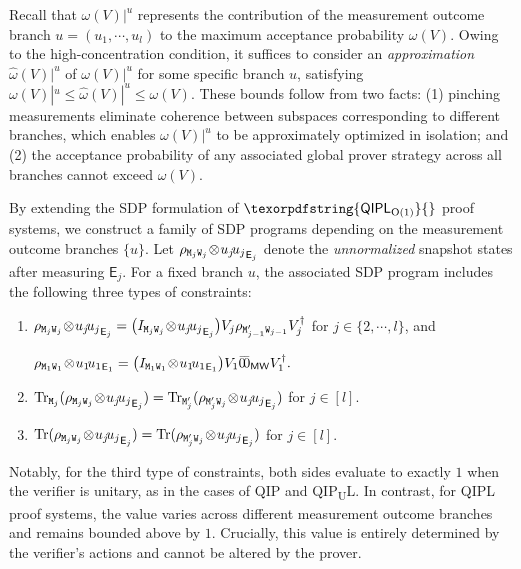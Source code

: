 \documentclass[10pt,a4paper]{article}
\numberwithin{equation}{section}
\numberwithin{figure}{section}
\newcommand{\QIP}{\textnormal{\textsf{QIP}}\xspace}
\newcommand{\QIPL}{\textnormal{\textsf{QIPL}}\xspace}
\newcommand{\QIPLconst}{\texorpdfstring{\textnormal{\textsf{QIPL}\textsubscript{O(1)}}}\xspace}
\newcommand{\QIPUL}{\texorpdfstring{\textnormal{\textsf{QIP}\textsubscript{\textnormal{U}}\textsf{L}}}\xspace}
\let\ket\relax\DeclarePairedDelimiter\ket{\lvert}{\rangle}
\let\bra\relax\DeclarePairedDelimiter\bra{\langle}{\rvert}
\newcommand{\ketbra}[2]{\ensuremath{\ket{#1}\!\bra{#2}}}
\newcommand{\Tr}{\mathrm{Tr}}
\newcommand{\sfE}{\mathsf{E}}
\newcommand{\sfM}{\mathsf{M}}
\newcommand{\sfW}{\mathsf{W}}
\newcommand{\ttM}{\mathtt{M}}
\newcommand{\ttW}{\mathtt{W}}
\begin{document}
Recall that $\omega(V)|^u$ represents the contribution of the measurement outcome branch $u=(u_1,\cdots,u_l)$ to the maximum acceptance probability $\omega(V)$. 
Owing to the high-concentration condition, it suffices to consider an \textit{approximation} $\widehat{\omega}(V)|^u$ of $\omega(V)|^u$ for some specific branch $u$, satisfying $\omega(V)|^u \leq \widehat{\omega}(V)|^u \leq \omega(V)$.
These bounds follow from two facts: (1) pinching measurements eliminate coherence between subspaces corresponding to different branches, which enables $\omega(V)|^u$ to be approximately optimized in isolation; and (2) the acceptance probability of any associated global prover strategy across all branches cannot exceed $\omega(V)$. 

By extending the SDP formulation of $\QIPLconst{}$ proof systems, we construct a family of SDP programs depending on the measurement outcome branches $\{u\}$. 
Let $\rho_{\ttM_j\ttW_j}\!\otimes\! \ketbra{u_j}{u_j}_{\sfE_j}$ denote the \textit{unnormalized} snapshot states after measuring $\sfE_j$. 
For a fixed branch $u$, the associated SDP program includes the following three types of constraints: 
\begin{enumerate}[label={\upshape(\roman*')}, itemsep=0.33em, topsep=0.33em, parsep=0.33em]
    \item $\rho_{\ttM_{j}\ttW_{j}} \!\otimes\! \ketbra{u_{j}}{u_{j}}_{\sfE_{j}} = \big( I_{\ttM_{j}\ttW_{j}} \!\otimes\! \ketbra{u_{j}}{u_{j}}_{\sfE_{j}}\big) V_{j}  \rho_{\ttM'_{j-1}\ttW_{j-1}} V_{j}^{\dagger}$ for $j\in \{2,\cdots,l\}$, and 
    
    $\rho_{\ttM_1\ttW_1} \!\otimes\! \ketbra{u_1}{u_1}_{\sfE_1} = \big( I_{\ttM_1\ttW_1} \!\otimes\! \ketbra{u_1}{u_1}_{\sfE_1}\big) V_1 \ketbra{\bar{0}}{\bar{0}}_{\sfM\sfW}V_1^{\dagger}.$
    \item $\Tr_{\ttM_j}(\rho_{\ttM_j\ttW_j} \!\otimes\! \ketbra{u_j}{u_j}_{\sfE_j}) = \Tr_{\ttM'_j}(\rho_{\ttM'_j\ttW_j} \!\otimes\! \ketbra{u_j}{u_j}_{\sfE_j})$ for $j \in [l]$.
    \item $\Tr(\rho_{\ttM_j\ttW_j} \!\otimes\! \ketbra{u_j}{u_j}_{\sfE_j}) = \Tr(\rho_{\ttM'_j\ttW_j} \!\otimes\! \ketbra{u_j}{u_j}_{\sfE_j})$ for $j \in [l]$.
\end{enumerate}
Notably, for the third type of constraints, both sides evaluate to exactly $1$ when the verifier is unitary, as in the cases of \QIP{} and \QIPUL{}. In contrast, for \QIPL{} proof systems, the value varies across different measurement outcome branches and remains bounded above by $1$. Crucially, this value is entirely determined by the verifier's actions and cannot be altered by the prover. 
\end{document}
